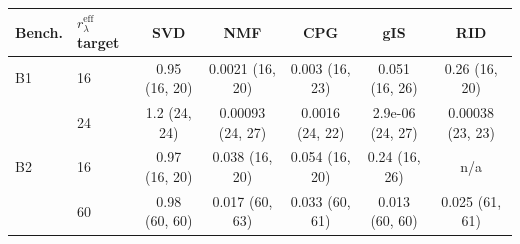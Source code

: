 \begin{tabular}{@{}llccccc@{}}
\toprule
Bench. & $r_{\lambda}^{\mathrm{eff}}$ target & SVD & NMF & CPG & gIS & RID \\
\midrule
B1 & 16 & 0.95 (16, 20) & 0.0021 (16, 20) & 0.003 (16, 23) & 0.051 (16, 26) & 0.26 (16, 20) \\
 & 24 & 1.2 (24, 24) & 0.00093 (24, 27) & 0.0016 (24, 22) & 2.9e-06 (24, 27) & 0.00038 (23, 23) \\
\midrule
B2 & 16 & 0.97 (16, 20) & 0.038 (16, 20) & 0.054 (16, 20) & 0.24 (16, 26) & n/a \\
 & 60 & 0.98 (60, 60) & 0.017 (60, 63) & 0.033 (60, 61) & 0.013 (60, 60) & 0.025 (61, 61) \\
\bottomrule
\end{tabular}
